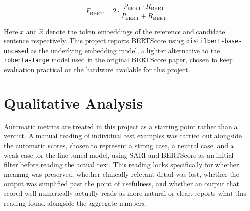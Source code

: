 \begin{equation}
    \label{eq:bertscore-f1}
    F_{\text{BERT}} = 2 \cdot \frac{P_{\text{BERT}} \cdot R_{\text{BERT}}}{P_{\text{BERT}} + R_{\text{BERT}}}
\end{equation}

Here $x$ and $\hat{x}$ denote the token embeddings of the reference and candidate sentence respectively. This project reports BERTScore using \texttt{distilbert-base-uncased} as the underlying embedding model, a lighter alternative to the \texttt{roberta-large} model used in the original BERTScore paper, chosen to keep evaluation practical on the hardware available for this project.

\section{Qualitative Analysis}
\label{sec:qualitative-approach}

Automatic metrics are treated in this project as a starting point rather than a verdict. A manual reading of individual test examples was carried out alongside the automatic scores, chosen to represent a strong case, a neutral case, and a weak case for the fine-tuned model, using SARI and BERTScore as an initial filter before reading the actual text. This reading looks specifically for whether meaning was preserved, whether clinically relevant detail was lost, whether the output was simplified past the point of usefulness, and whether an output that scored well numerically actually reads as more natural or clear.  reports what this reading found alongside the aggregate numbers.
